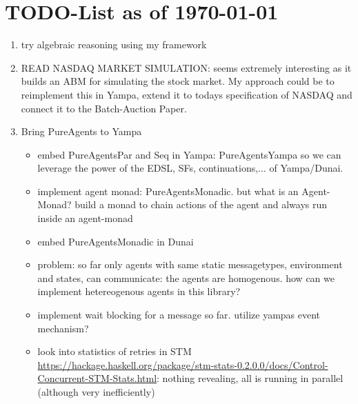 \section{TODO-List as of \today}

\begin{enumerate}

\item try algebraic reasoning using my framework

\item READ NASDAQ MARKET SIMULATION: seems extremely interesting as it builds an ABM for simulating the stock market. My approach could be to reimplement this in Yampa, extend it to todays specification of NASDAQ and connect it to the Batch-Auction Paper.

\item Bring PureAgents to Yampa
	\begin{itemize}
		\item embed PureAgentsPar and Seq in Yampa: PureAgentsYampa so we can leverage the power of the EDSL, SFs, continuations,... of Yampa/Dunai.
		\item implement agent monad: PureAgentsMonadic. but what is an Agent-Monad? build a monad to chain actions of the agent and always run inside an agent-monad
		\item embed PureAgentsMonadic in Dunai
		\item problem: so far only agents with same static messagetypes, environment and states, can communicate: the agents are homogenous. how can we implement hetereogenous agents in this library?
		\item implement wait blocking for a message so far. utilize yampas event mechanism?
		\item look into statistics of retries in STM \url{https://hackage.haskell.org/package/stm-stats-0.2.0.0/docs/Control-Concurrent-STM-Stats.html}: nothing revealing, all is running in parallel (although very inefficiently)
	\end{itemize}


\end{enumerate}
